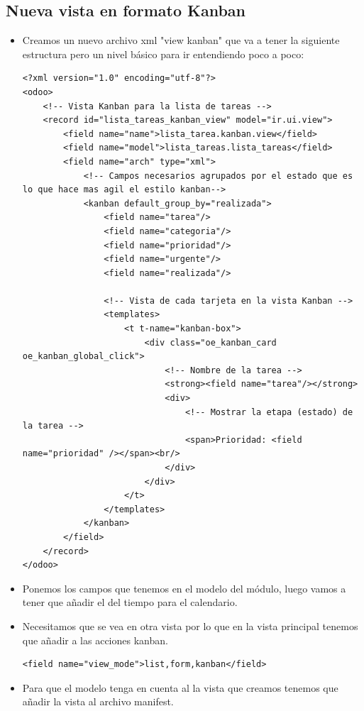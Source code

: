 \documentclass[a4paper,12pt]{article}
\begin{document}
\subsection{Nueva vista en formato Kanban}  
    \begin{itemize}
        \item Creamos un nuevo archivo xml "view kanban" que va a tener la siguiente estructura pero un nivel básico para ir entendiendo poco a poco:
        
        \vspace{0.5cm}
        \begin{lstlisting}[style=javascript]
<?xml version="1.0" encoding="utf-8"?>
<odoo>
    <!-- Vista Kanban para la lista de tareas -->
    <record id="lista_tareas_kanban_view" model="ir.ui.view">
        <field name="name">lista_tarea.kanban.view</field>
        <field name="model">lista_tareas.lista_tareas</field>
        <field name="arch" type="xml">
            <!-- Campos necesarios agrupados por el estado que es lo que hace mas agil el estilo kanban-->
            <kanban default_group_by="realizada">
                <field name="tarea"/>
                <field name="categoria"/>
                <field name="prioridad"/>
                <field name="urgente"/>
                <field name="realizada"/>
                
                <!-- Vista de cada tarjeta en la vista Kanban -->
                <templates>
                    <t t-name="kanban-box">
                        <div class="oe_kanban_card oe_kanban_global_click">
                            <!-- Nombre de la tarea -->
                            <strong><field name="tarea"/></strong>
                            <div>
                                <!-- Mostrar la etapa (estado) de la tarea -->
                                <span>Prioridad: <field name="prioridad" /></span><br/>
                            </div>
                        </div>
                    </t>
                </templates>
            </kanban>
        </field>
    </record>
</odoo>
    \end{lstlisting}
    \item Ponemos los campos que tenemos en el modelo del módulo, luego vamos a tener que añadir el del tiempo para el calendario. 
    \item Necesitamos que se vea en otra vista por lo que en la vista principal tenemos que añadir a las acciones kanban.

\vspace{0.5cm}
\begin{lstlisting}[style=javascript]
<field name="view_mode">list,form,kanban</field>
\end{lstlisting}    
    \item Para que el modelo tenga en cuenta al la vista que creamos tenemos que añadir la vista al archivo manifest.


\end{itemize}
\end{document}
